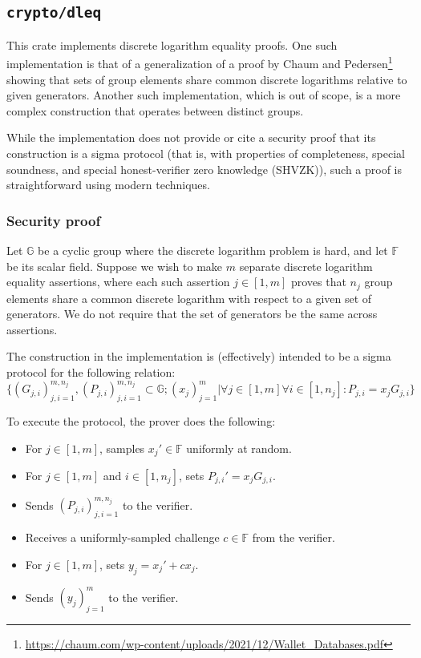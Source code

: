 \documentclass{article}
\begin{document}
\subsection{\texttt{crypto/dleq}}

This crate implements discrete logarithm equality proofs.
One such implementation is that of a generalization of a proof by Chaum and Pedersen\footnote{\url{https://chaum.com/wp-content/uploads/2021/12/Wallet_Databases.pdf}} showing that sets of group elements share common discrete logarithms relative to given generators.
Another such implementation, which is out of scope, is a more complex construction that operates between distinct groups.

While the implementation does not provide or cite a security proof that its construction is a sigma protocol (that is, with properties of completeness, special soundness, and special honest-verifier zero knowledge (SHVZK)), such a proof is straightforward using modern techniques.


\subsubsection{Security proof}

Let $\mathbb{G}$ be a cyclic group where the discrete logarithm problem is hard, and let $\mathbb{F}$ be its scalar field.
Suppose we wish to make $m$ separate discrete logarithm equality assertions, where each such assertion $j \in [1,m]$ proves that $n_j$ group elements share a common discrete logarithm with respect to a given set of generators.
We do not require that the set of generators be the same across assertions.

The construction in the implementation is (effectively) intended to be a sigma protocol for the following relation:
$$\lbrace (G_{j,i})_{j,i=1}^{m,n_j},(P_{j,i})_{j,i=1}^{m,n_j} \subset \mathbb{G};  (x_j)_{j=1}^m | \forall j \in [1,m] \forall i \in [1,n_j] : P_{j,i} = x_j G_{j,i} \rbrace$$

To execute the protocol, the prover does the following:
\begin{itemize}
\item For $j \in [1,m]$, samples $x_j' \in \mathbb{F}$ uniformly at random.
\item For $j \in [1,m]$ and $i \in [1,n_j]$, sets $P_{j,i}' = x_j G_{j,i}$.
\item Sends $(P_{j,i})_{j,i=1}^{m,n_j}$ to the verifier.
\item Receives a uniformly-sampled challenge $c \in \mathbb{F}$ from the verifier.
\item For $j \in [1,m]$, sets $y_j = x_j' + cx_j$.
\item Sends $(y_j)_{j=1}^m$ to the verifier.
\end{itemize}
\end{document}
